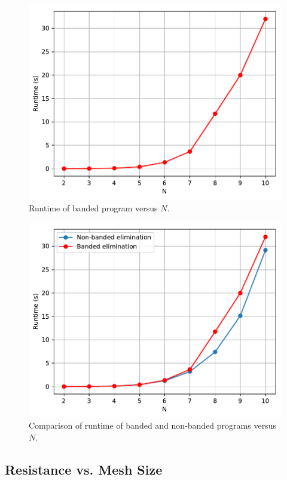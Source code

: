 \documentclass[a4paper,titlepage]{article}
\begin{document}
	\begin{figure}[!htb]
		\centering
		\includegraphics[width=\columnwidth]{plots/q2c.pdf}
		\caption
		{Runtime of banded program versus $N$.}
		\label{fig:q2c}
	\end{figure}

	\begin{figure}[!htb]
		\centering
		\includegraphics[width=\columnwidth]{plots/q2bc.pdf}
		\caption
		{Comparison of runtime of banded and non-banded programs versus $N$.}
		\label{fig:q2bc}
	\end{figure}
	
	\subsection{Resistance vs. Mesh Size}
	
\end{document}
